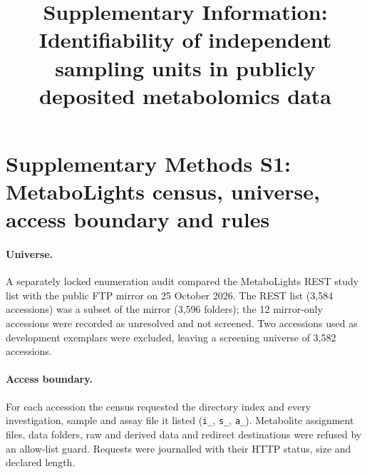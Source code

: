 \documentclass[sn-basic]{sn-jnl}
\begin{document}
\title[Supplementary Information]{Supplementary Information: Identifiability of independent sampling units in publicly deposited metabolomics data}
\author*[1]{ }
\maketitle
\renewcommand{\thetable}{S\arabic{table}}

\section*{Supplementary Methods S1: MetaboLights census, universe, access boundary and rules}
\paragraph{Universe.} A separately locked enumeration audit compared the MetaboLights REST study list with the public
FTP mirror on 25 October 2026. The REST list (3,584 accessions) was a subset of the mirror (3,596 folders); the 12
mirror-only accessions were recorded as unresolved and not screened. Two accessions used as development exemplars
were excluded, leaving a screening universe of 3,582 accessions.

\paragraph{Access boundary.} For each accession the census requested the directory index and every investigation,
sample and assay file it listed (\texttt{i\_}, \texttt{s\_}, \texttt{a\_}). Metabolite assignment files, data folders,
raw and derived data and redirect destinations were refused by an allow-list guard. Requests were journalled with
their HTTP status, size and declared length.
\end{document}
